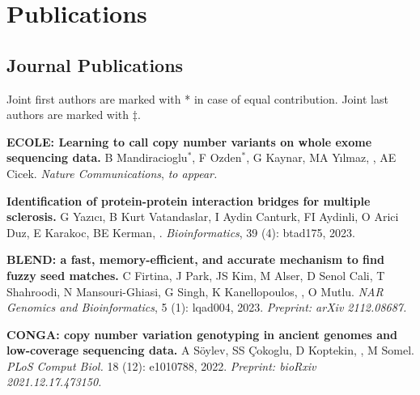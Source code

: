\section{\sc Publications}
                                       
                                       \vspace{-0.5cm}
                                       
                                       \subsection{\small \sc Journal Publications}
                                       \vspace{-0.6cm}
                                       
                                       \small{
                                         Joint first authors are marked with * in case of equal contribution. Joint last authors are marked with $\ddag$.
                                       }

\vspace{-.2cm}
{\bf ECOLE: Learning to call copy number variants on whole exome sequencing data.} B Mandiracioglu$^\ast$,
F Ozden$^\ast$, G Kaynar, MA Yılmaz, \calkan{}, AE Cicek.
{\it Nature Communications}, \textit{to appear.}

\vspace{-.2cm}
{\bf Identification of protein-protein interaction bridges for multiple sclerosis.} G Yazıcı, B Kurt Vatandaslar, I Aydin Canturk, FI Aydinli, O Arici Duz, E Karakoc, BE Kerman, \calkan{}. {\it Bioinformatics}, 39 (4): btad175, 2023.

\vspace{-.2cm}
{\bf BLEND: a fast, memory-efficient, and accurate mechanism to find fuzzy seed matches.}
C Firtina, J Park, JS Kim, M Alser, D Senol Cali, T Shahroodi, N Mansouri-Ghiasi, G Singh, K Kanellopoulos, \calkan{}, O Mutlu. {\it NAR Genomics and Bioinformatics}, 5 (1): lqad004, 2023.
\textit{Preprint: arXiv 2112.08687.}

\vspace{-.2cm}
{\bf CONGA: copy number variation genotyping in ancient genomes and low-coverage sequencing data.}  A Söylev, SS Çokoglu, D Koptekin, \calkan{}, M Somel.  
{\it PLoS Comput Biol.} 18 (12): e1010788, 2022.
\textit{Preprint: bioRxiv 2021.12.17.473150.}

